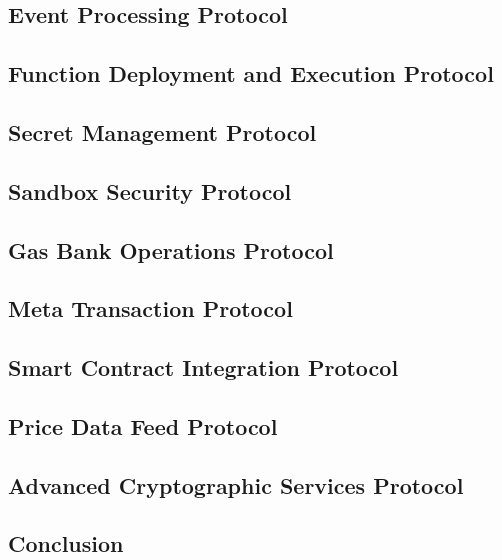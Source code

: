 \subsection{Event Processing Protocol}
\label{subsec:event-protocol}

\subsection{Function Deployment and Execution Protocol}
\label{subsec:function-protocol}

\subsection{Secret Management Protocol}
\label{subsec:secret-protocol}

\subsection{Sandbox Security Protocol}
\label{subsec:sandbox-protocol}

\subsection{Gas Bank Operations Protocol}
\label{subsec:gas-bank-protocol}

\subsection{Meta Transaction Protocol}
\label{subsec:meta-tx-protocol}

\subsection{Smart Contract Integration Protocol}
\label{subsec:smart-contract-protocol}

\subsection{Price Data Feed Protocol}
\label{subsec:price-feed-protocol}

\subsection{Advanced Cryptographic Services Protocol}
\label{subsec:advanced-crypto-protocol}

\subsection{Conclusion}
\label{subsec:nsl-conclusion}

